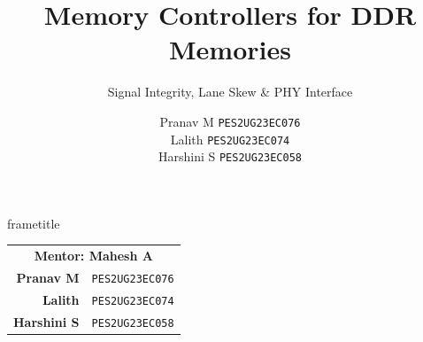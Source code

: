 \documentclass[aspectratio=169,10pt]{beamer}
\title{Memory Controllers for DDR Memories}
\subtitle{Signal Integrity, Lane Skew \& PHY Interface}
\author{%
  Pranav M \texttt{PES2UG23EC076}\\[4pt]
  Lalith \texttt{PES2UG23EC074}\\[4pt]
  Harshini S \texttt{PES2UG23EC058}%
}
\institute{Centre for Heterogeneous \& Intelligent Processing Systems\\PES University}
\date{}
\begin{document}

\begin{frame}
  \begin{beamercolorbox}[wd=\paperwidth,ht=0.22\paperheight,dp=0pt,
      center,sep=10pt]{frametitle}
    \color{white}\inserttitle
  \end{beamercolorbox}
  \vspace{28pt}
  \begin{center}
    \begin{tabular}{rl}
      \multicolumn{2}{c}{\textbf{Mentor: Mahesh A}}\\[8pt]
      \textbf{Pranav M}   & \texttt{PES2UG23EC076}\\[8pt]
      \textbf{Lalith}     & \texttt{PES2UG23EC074}\\[8pt]
      \textbf{Harshini S} & \texttt{PES2UG23EC058}\\
    \end{tabular}
  \end{center}
\end{frame}
\end{document}
